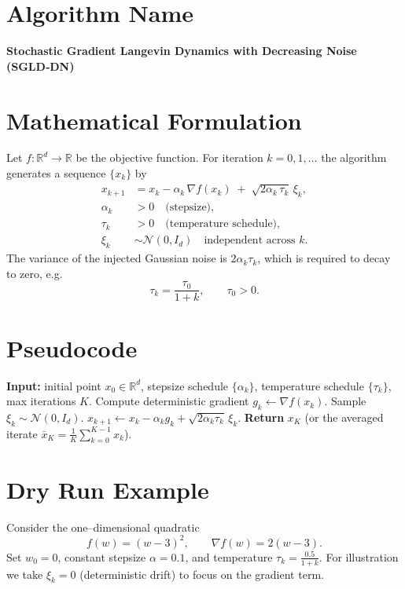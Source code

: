 \documentclass{article}
\newcommand{\R}{\mathbb{R}}
\begin{document}
\section*{Algorithm Name}
\textbf{Stochastic Gradient Langevin Dynamics with Decreasing Noise (SGLD‑DN)}  

\section*{Mathematical Formulation}
Let $f:\R^{d}\to\R$ be the objective function.
For iteration $k=0,1,\dots$ the algorithm generates a sequence $\{x_k\}$ by
\begin{align}
x_{k+1}
&= x_k - \alpha_k \,\nabla f(x_k) \;+\; \sqrt{2\alpha_k\,\tau_k}\,\xi_k, \label{eq:update}\\
\alpha_k &>0 \quad\text{(stepsize)},\\
\tau_k &>0 \quad\text{(temperature schedule)},\\
\xi_k &\sim \mathcal N(0,I_d)\quad\text{independent across $k$}. \label{eq:noise}
\end{align}
The variance of the injected Gaussian noise is $2\alpha_k\tau_k$, which is required to decay to zero, e.g.
\[
\tau_k = \frac{\tau_0}{1+k},\qquad \tau_0>0.
\]

\section*{Pseudocode}
\begin{algorithm}[H]
\caption{SGLD‑DN}
\begin{algorithmic}[1]
\State \textbf{Input:} initial point $x_0\in\R^d$, stepsize schedule $\{\alpha_k\}$, temperature schedule $\{\tau_k\}$, max iterations $K$.
    \State Compute deterministic gradient $g_k \gets \nabla f(x_k)$.
    \State Sample $\xi_k \sim \mathcal N(0,I_d)$.
    \State $x_{k+1} \gets x_k - \alpha_k g_k + \sqrt{2\alpha_k\tau_k}\,\xi_k$.
\EndFor
\State \textbf{Return} $x_K$ (or the averaged iterate $\bar x_K=\frac1K\sum_{k=0}^{K-1}x_k$).
\end{algorithmic}
\end{algorithm}

\section*{Dry Run Example}
Consider the one–dimensional quadratic
\[
f(w)=(w-3)^2,\qquad \nabla f(w)=2(w-3).
\]
Set $w_0=0$, constant stepsize $\alpha=0.1$, and temperature $\tau_k=\frac{0.5}{1+k}$.
For illustration we take $\xi_k=0$ (deterministic drift) to focus on the gradient term.
\end{document}
